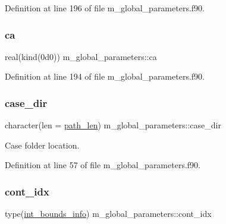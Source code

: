 Definition at line 196 of file m\+\_\+global\+\_\+parameters.\+f90.

\mbox{\label{namespacem__global__parameters_a1fcd6cc13ad7f604ef81708716a1feac}} 
\subsubsection{\texorpdfstring{ca}{ca}}
{\footnotesize\ttfamily real(kind(0d0)) m\+\_\+global\+\_\+parameters\+::ca}



Definition at line 194 of file m\+\_\+global\+\_\+parameters.\+f90.

\mbox{\label{namespacem__global__parameters_a0b91e533fe3b3e112c42af4024014544}} 
\subsubsection{\texorpdfstring{case\+\_\+dir}{case\_dir}}
{\footnotesize\ttfamily character(len = \hyperlink{namespacem__global__parameters_aa9d578c318044b2f2ec990b5fc0dfab9}{path\+\_\+len}) m\+\_\+global\+\_\+parameters\+::case\+\_\+dir}



Case folder location. 



Definition at line 57 of file m\+\_\+global\+\_\+parameters.\+f90.

\mbox{\label{namespacem__global__parameters_a5d234ed722013d06fbb2d1ee5f8aab56}} 
\subsubsection{\texorpdfstring{cont\+\_\+idx}{cont\_idx}}
{\footnotesize\ttfamily type(\hyperlink{structm__derived__types_1_1int__bounds__info}{int\+\_\+bounds\+\_\+info}) m\+\_\+global\+\_\+parameters\+::cont\+\_\+idx}



